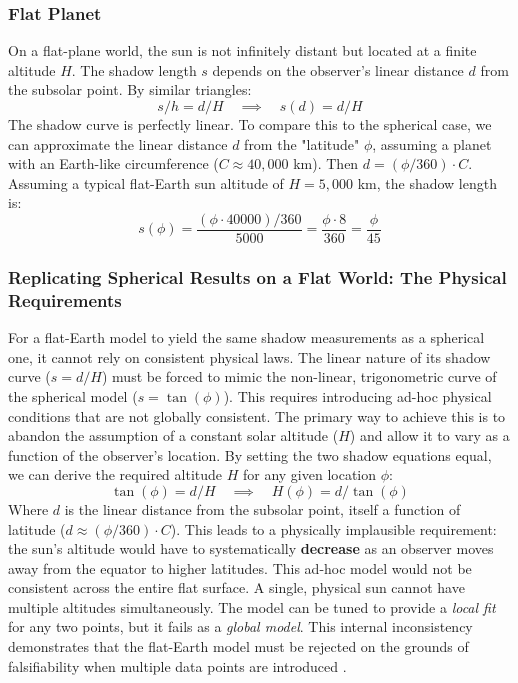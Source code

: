 \documentclass[11pt]{article}
\begin{document}
\subsubsection{Flat Planet}
On a flat-plane world, the sun is not infinitely distant but located at a finite altitude $H$. The shadow length $s$ depends on the observer's linear distance $d$ from the subsolar point. By similar triangles:
\begin{equation}
    s/h = d/H \quad \implies \quad s(d) = d/H
    \label{eq:shadow_flat}
\end{equation}
The shadow curve is perfectly linear. To compare this to the spherical case, we can approximate the linear distance $d$ from the "latitude" $\phi$, assuming a planet with an Earth-like circumference ($C \approx 40,000$ km). Then $d = (\phi/360) \cdot C$. Assuming a typical flat-Earth sun altitude of $H = 5,000$ km, the shadow length is:
\[
s(\phi) = \frac{ (\phi \cdot 40000) / 360 }{5000} = \frac{\phi \cdot 8}{360} = \frac{\phi}{45}
\]

\subsubsection{Replicating Spherical Results on a Flat World: The Physical Requirements}
For a flat-Earth model to yield the same shadow measurements as a spherical one, it cannot rely on consistent physical laws. The linear nature of its shadow curve ($s = d/H$) must be forced to mimic the non-linear, trigonometric curve of the spherical model ($s = \tan(\phi)$). This requires introducing ad-hoc physical conditions that are not globally consistent. The primary way to achieve this is to abandon the assumption of a constant solar altitude ($H$) and allow it to vary as a function of the observer's location. By setting the two shadow equations equal, we can derive the required altitude $H$ for any given location $\phi$:
\begin{equation}
    \tan(\phi) = d/H \quad \implies \quad H(\phi) = d / \tan(\phi)
    \label{eq:H_phi}
\end{equation}
Where $d$ is the linear distance from the subsolar point, itself a function of latitude ($d \approx (\phi/360) \cdot C$). This leads to a physically implausible requirement: the sun's altitude would have to systematically \textbf{decrease} as an observer moves away from the equator to higher latitudes. This ad-hoc model would not be consistent across the entire flat surface. A single, physical sun cannot have multiple altitudes simultaneously. The model can be tuned to provide a \textit{local fit} for any two points, but it fails as a \textit{global model}. This internal inconsistency demonstrates that the flat-Earth model must be rejected on the grounds of falsifiability when multiple data points are introduced \cite{Popper1959}.
\end{document}
